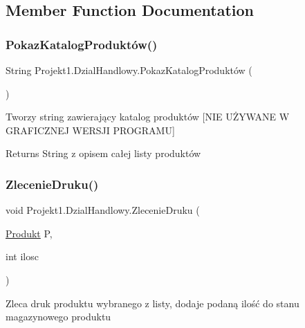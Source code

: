 \subsection{Member Function Documentation}
\mbox{\label{class_projekt1_1_1_dzial_handlowy_ab9f6e28c74e71c9348c1f03b731c71c1}} 
\subsubsection{\texorpdfstring{PokazKatalogProduktów()}{PokazKatalogProduktów()}}
{\footnotesize\ttfamily String Projekt1.\+Dzial\+Handlowy.\+Pokaz\+Katalog\+Produktów (\begin{DoxyParamCaption}{ }\end{DoxyParamCaption})}



Tworzy string zawierający katalog produktów \mbox{[}N\+IE UŻ\+Y\+W\+A\+NE W G\+R\+A\+F\+I\+C\+Z\+N\+EJ W\+E\+R\+S\+JI P\+R\+O\+G\+R\+A\+MU\mbox{]} 

\begin{DoxyReturn}{Returns}
String z opisem całej listy produktów 
\end{DoxyReturn}
\mbox{\label{class_projekt1_1_1_dzial_handlowy_a42c78f53cf41e75b39498a7da96e7bc3}} 
\subsubsection{\texorpdfstring{ZlecenieDruku()}{ZlecenieDruku()}}
{\footnotesize\ttfamily void Projekt1.\+Dzial\+Handlowy.\+Zlecenie\+Druku (\begin{DoxyParamCaption}\item[{\mbox{\hyperlink{class_projekt1_1_1_produkt}{Produkt}}}]{P,  }\item[{int}]{ilosc }\end{DoxyParamCaption})}



Zleca druk produktu wybranego z listy, dodaje podaną ilość do stanu magazynowego produktu 



